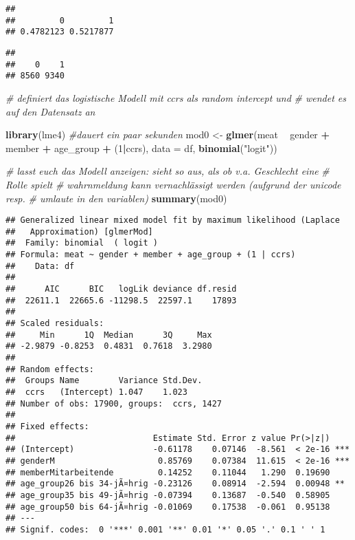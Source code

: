 \documentclass[
]{article}
\newenvironment{Shaded}{\begin{snugshade}}{\end{snugshade}}
\newcommand{\CommentTok}[1]{\textcolor[rgb]{0.56,0.35,0.01}{\textit{#1}}}
\newcommand{\DataTypeTok}[1]{\textcolor[rgb]{0.13,0.29,0.53}{#1}}
\newcommand{\DecValTok}[1]{\textcolor[rgb]{0.00,0.00,0.81}{#1}}
\newcommand{\KeywordTok}[1]{\textcolor[rgb]{0.13,0.29,0.53}{\textbf{#1}}}
\newcommand{\NormalTok}[1]{#1}
\newcommand{\OperatorTok}[1]{\textcolor[rgb]{0.81,0.36,0.00}{\textbf{#1}}}
\newcommand{\StringTok}[1]{\textcolor[rgb]{0.31,0.60,0.02}{#1}}
\begin{document}
\begin{verbatim}
## 
##         0         1 
## 0.4782123 0.5217877
\end{verbatim}

\begin{Shaded}
\end{Shaded}

\begin{verbatim}
## 
##    0    1 
## 8560 9340
\end{verbatim}

\begin{Shaded}
\begin{Highlighting}[]
\CommentTok{# definiert das logistische Modell mit ccrs als random intercept und }
\CommentTok{# wendet es auf den Datensatz an}

\KeywordTok{library}\NormalTok{(lme4)}
\CommentTok{#dauert ein paar sekunden}
\NormalTok{mod0 <-}\StringTok{ }\KeywordTok{glmer}\NormalTok{(meat }\OperatorTok{~}\StringTok{ }\NormalTok{gender }\OperatorTok{+}\StringTok{ }\NormalTok{member }\OperatorTok{+}\StringTok{ }\NormalTok{age_group }\OperatorTok{+}\StringTok{ }\NormalTok{(}\DecValTok{1}\OperatorTok{|}\NormalTok{ccrs),}
              \DataTypeTok{data =}\NormalTok{ df, }\KeywordTok{binomial}\NormalTok{(}\StringTok{"logit"}\NormalTok{)) }

\CommentTok{# lasst euch das Modell anzeigen: sieht so aus, als ob v.a. Geschlecht eine }
\CommentTok{# Rolle spielt}
\CommentTok{# wahrnmeldung kann vernachlässigt werden (aufgrund der unicode resp. }
\CommentTok{# umlaute in den variablen)}
\KeywordTok{summary}\NormalTok{(mod0) }
\end{Highlighting}
\end{Shaded}

\begin{verbatim}
## Generalized linear mixed model fit by maximum likelihood (Laplace
##   Approximation) [glmerMod]
##  Family: binomial  ( logit )
## Formula: meat ~ gender + member + age_group + (1 | ccrs)
##    Data: df
## 
##      AIC      BIC   logLik deviance df.resid 
##  22611.1  22665.6 -11298.5  22597.1    17893 
## 
## Scaled residuals: 
##     Min      1Q  Median      3Q     Max 
## -2.9879 -0.8253  0.4831  0.7618  3.2980 
## 
## Random effects:
##  Groups Name        Variance Std.Dev.
##  ccrs   (Intercept) 1.047    1.023   
## Number of obs: 17900, groups:  ccrs, 1427
## 
## Fixed effects:
##                            Estimate Std. Error z value Pr(>|z|)    
## (Intercept)                -0.61178    0.07146  -8.561  < 2e-16 ***
## genderM                     0.85769    0.07384  11.615  < 2e-16 ***
## memberMitarbeitende         0.14252    0.11044   1.290  0.19690    
## age_group26 bis 34-jÃ¤hrig -0.23126    0.08914  -2.594  0.00948 ** 
## age_group35 bis 49-jÃ¤hrig -0.07394    0.13687  -0.540  0.58905    
## age_group50 bis 64-jÃ¤hrig -0.01069    0.17538  -0.061  0.95138    
## ---
## Signif. codes:  0 '***' 0.001 '**' 0.01 '*' 0.05 '.' 0.1 ' ' 1
\end{verbatim}
\end{document}

